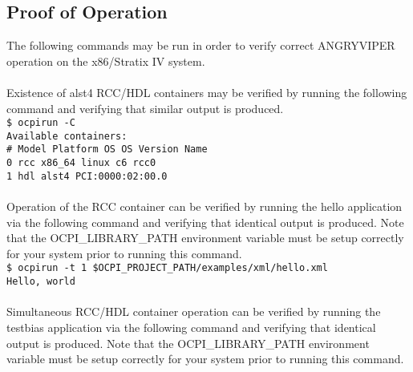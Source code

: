 \documentclass{article}
\newcommand{\terminaloutput}[1]{\texttt{#1}}
\begin{document}
\subsection*{Proof of Operation}
The following commands may be run in order to verify correct ANGRYVIPER operation on the x86/Stratix IV system.\\ \\
Existence of alst4 RCC/HDL containers may be verified by running the following command and verifying that similar output is produced.\\
\noindent\terminaloutput{\$ ocpirun -C\\
Available containers:\\
 \#  Model\hspace{6ex} Platform\hspace{3ex}    OS\hspace{5ex}     OS Version\hspace{1ex}  Name\\
 0  rcc\hspace{9ex}   x86\_64\hspace{5ex}      linux\hspace{2ex}  c6\hspace{10ex}          rcc0\\
 1  hdl\hspace{9ex}   alst4\hspace{29ex}                          PCI:0000:02:00.0
}\\ \\
Operation of the RCC container can be verified by running the hello application via the following command and verifying that identical output is produced. Note that the OCPI\_LIBRARY\_PATH environment variable must be setup correctly for your system prior to running this command.\\
\noindent\terminaloutput{\$ ocpirun -t 1 \$OCPI\_PROJECT\_PATH/examples/xml/hello.xml \\
Hello, world} \\ \\
Simultaneous RCC/HDL container operation can be verified by running the testbias application via the following command and verifying that identical output is produced. Note that the OCPI\_LIBRARY\_PATH environment variable must be setup correctly for your system prior to running this command.\\
\end{document}
